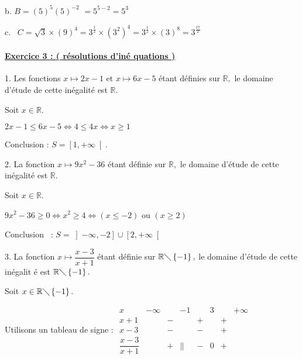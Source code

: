 \documentclass{article}
\begin{document}
b. $B=(5)^{5}\left( 5\right) ^{-2}$ $=5^{5-2}=5^{3}$\ 

c. \ $C=\sqrt{3}\times \left( 9\right) ^{4}=3^{\frac{1}{2}}\times
(3^{2})^{4}=3^{\frac{1}{2}}\times (3)^{8}=3^{\frac{17}{2}}$

\paragraph{\protect\underline{Exercice 3 : ( r\'{e}solutions d'in\'{e}%
quations )}}

1. Les fonctions $x\mapsto 2x-1$ et $x\mapsto 6x-5$ \'{e}tant d\'{e}finies
sur $%
\mathbb{R}
,$ le domaine d'\'{e}tude de cette in\'{e}galit\'{e} est $%
\mathbb{R}
.$

Soit $x\in 
\mathbb{R}
.$

$2x-1\leq 6x-5\Leftrightarrow 4\leq 4x\Leftrightarrow x\geq 1$

Conclusion : $S=\left[ 1,+\infty \right[ .$

2. La fonction $x\mapsto 9x^{2}-36$ \'{e}tant d\'{e}finie sur $%
\mathbb{R}
,$ le domaine d'\'{e}tude de cette in\'{e}galit\'{e} est $%
\mathbb{R}
.$

Soit $x\in 
\mathbb{R}
.$

$9x^{2}-36\geq 0\Leftrightarrow x^{2}\geq 4\Leftrightarrow (x\leq -2)$ ou $%
\left( x\geq 2\right) $

Conclusion \ : $S=\left] -\infty ,-2\right] \cup \left[ 2,+\infty \right[ $

3. La fonction $x\mapsto \dfrac{x-3}{x+1}$ \'{e}tant d\'{e}finie sur $%
\mathbb{R}
\diagdown \left\{ -1\right\} ,$ le domaine d'\'{e}tude de cette in\'{e}galit%
\'{e} est $%
\mathbb{R}
\diagdown \left\{ -1\right\} .$

Soit $x\in 
\mathbb{R}
\diagdown \left\{ -1\right\} .$

Utilisons un tableau de signe : $%
\begin{array}{cccccccc}
x & -\infty &  & -1 &  & 3 &  & +\infty \\ 
x+1 &  & - &  & + &  & + &  \\ 
x-3 &  & - &  & - &  & + &  \\ 
\dfrac{x-3}{x+1} &  & + & \parallel & - & 0 & + & 
\end{array}%
$
\end{document}

